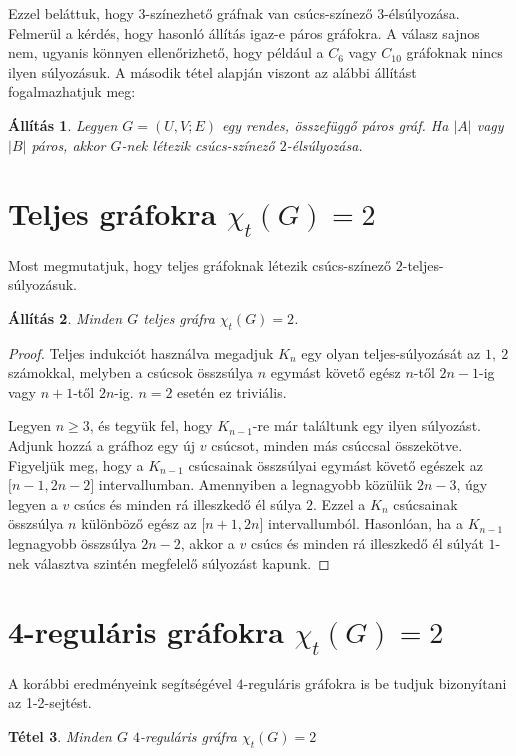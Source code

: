 \documentclass[12pt, a4paper]{report}
\newtheorem{tét}{Tétel}[section]
\newtheorem{áll}[tét]{Állítás}
\theoremstyle{remark}
\theoremstyle{definition}
\begin{document}
Ezzel beláttuk, hogy $3$-színezhető gráfnak van csúcs-színező $3$-élsúlyozása. Felmerül a kérdés, hogy hasonló állítás igaz-e páros gráfokra. A válasz sajnos nem, ugyanis könnyen ellenőrizhető, hogy például a $C_6$ vagy $C_{10}$ gráfoknak nincs ilyen súlyozásuk. A második tétel alapján viszont az alábbi állítást fogalmazhatjuk meg:

\begin{áll}
Legyen $G = (U, V; E)$ egy rendes, összefüggő páros gráf. Ha $|A|$ vagy $|B|$ páros, akkor $G$-nek létezik csúcs-színező $2$-élsúlyozása.
\end{áll}

\section{Teljes gráfokra $χ_t(G) = 2$}
Most megmutatjuk, hogy teljes gráfoknak létezik csúcs-színező $2$-teljes-súlyozásuk.

\begin{áll}
Minden $G$ teljes gráfra $\chi_t(G) = 2$.
\end{áll}

\begin{proof}
Teljes indukciót használva megadjuk $K_n$ egy olyan teljes-súlyozását az $1,\ 2$ számokkal, melyben a csúcsok összsúlya $n$ egymást követő egész $n$-től $2n - 1$-ig vagy $n + 1$-től $2n$-ig. $n = 2$ esetén ez triviális.

Legyen $n \geq 3$, és tegyük fel, hogy $K_{n - 1}$-re már találtunk egy ilyen súlyozást. Adjunk hozzá a gráfhoz egy új $v$ csúcsot, minden más csúccsal összekötve. Figyeljük meg, hogy a $K_{n - 1}$ csúcsainak összsúlyai egymást követő egészek az $\lbrack n - 1, 2n - 2 \rbrack$ intervallumban. Amennyiben a legnagyobb közülük $2n - 3$, úgy legyen a $v$ csúcs és minden rá illeszkedő él súlya $2$. Ezzel a $K_n$ csúcsainak összsúlya $n$ különböző egész az $\lbrack n + 1, 2n \rbrack$ intervallumból. Hasonlóan, ha a $K_{n - 1}$ legnagyobb összsúlya $2n - 2$, akkor a $v$ csúcs és minden rá illeszkedő él súlyát $1$-nek választva szintén megfelelő súlyozást kapunk.
\end{proof}

\section{4-reguláris gráfokra $χ_t(G) = 2$}
A korábbi eredményeink segítségével $4$-reguláris gráfokra is be tudjuk bizonyítani az 1-2-sejtést.

\begin{tét}
Minden $G$ $4$-reguláris gráfra $\chi_t(G) = 2$
\end{tét}
\end{document}
